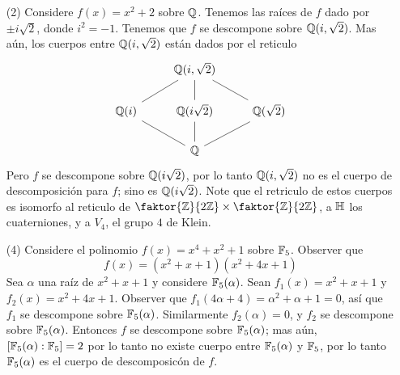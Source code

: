 \begin{example}
\begin{enumerate}
         \item[(2)] Considere $f(x)=x^2+2$ sobre $\mathbb{Q}$. Tenemos las ra\'ices de
             $f$ dado por  $\pm i\sqrt{2}$, donde $i^2=-1$. Tenemos que  $f$ se
             descompone sobre $\mathbb{Q}(i,\sqrt{2})$. Mas a\'un, los cuerpos entre
             $\mathbb{Q}(i,\sqrt{2})$ est\'an dados por el reticulo
             \[\begin{tikzcd}
                & {\Q(i,\sqrt{2})} \\
                \Q(i) & \Q(i\sqrt{2}) & \Q(\sqrt{2}) \\
                & {\mathbb{Q}}
                \arrow[no head, from=1-2, to=2-2]
                \arrow[no head, from=1-2, to=2-1]
                \arrow[no head, from=2-1, to=3-2]
                \arrow[no head, from=3-2, to=2-3]
                \arrow[no head, from=2-3, to=1-2]
                \arrow[no head, from=2-2, to=3-2]
              \end{tikzcd}\]
              Pero $f$ se descompone sobre  $\mathbb{Q}(i\sqrt{2})$, por lo tanto
              $\mathbb{Q}(i,\sqrt{2})$ no es el cuerpo de descomposici\'on para $f$;
              sino es  $\mathbb{Q}(i\sqrt{2})$. Note que el retriculo de estos cuerpos
              es isomorfo al reticulo de $\faktor{\Z}{2\Z} \times
              \faktor{\Z}{2\Z}$, a $\mathbb{H}$ los cuaterniones, y a  $V_4$, el grupo
              $4$ de Klein.

          \item[(4)] Considere el polinomio $f(x)=x^4+x^2+1$ sobre $\mathbb{F}_5$.
              Observer que
              \begin{equation*}
                  f(x)=(x^2+x+1)(x^2+4x+1)
              \end{equation*}
              Sea $\alpha$ una ra\'iz de $x^2+x+1$ y considere $\mathbb{F}_5(\alpha)$.
              Sean $f_1(x)=x^2+x+1$ y $f_2(x)=x^2+4x+1$. Observer que
              $f_1(4\alpha+4)=\alpha^2+\alpha+1=0$, as\'i que $f_1$ se
              descompone sobre $\mathbb{F}_5(\alpha)$. Similarmente $f_2(\alpha)=0$, y
              $f_2$ se descompone sobre $\mathbb{F}_5(\alpha)$. Entonces $f$ se
              descompone sobre  $\mathbb{F}_5(\alpha)$; mas a\'un, $[\mathbb{F}_5(\alpha) :
              \mathbb{F}_5]=2$ por lo tanto no existe cuerpo entre $\mathbb{F}_5(\alpha)$ y
              $\mathbb{F}_5$, por lo tanto $\mathbb{F}_5(\alpha)$ es el cuerpo de
              descomposic\'on de $f$.
    \end{enumerate}
\end{example}

